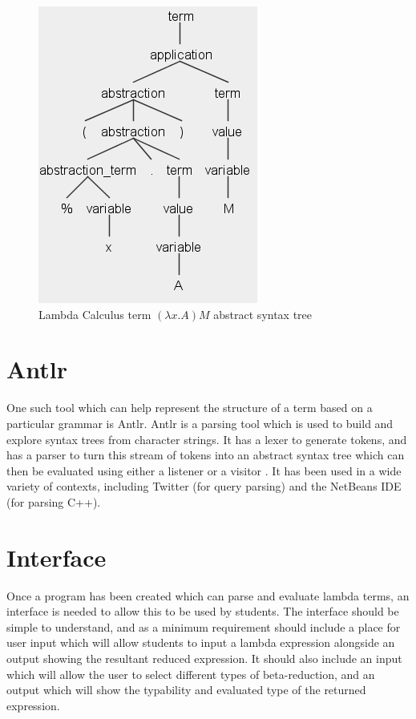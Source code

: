 \documentclass[a4paper,11pt]{report}
\begin{document}
\begin{figure}[p]
	\centering
	\includegraphics[scale=0.75]{images/abstract_syntax_tree}
	\caption{Lambda Calculus term $(\lambda x.A)M$ abstract syntax tree}
	\label{abstract_syntax_tree}
\end{figure}


\section{Antlr}

One such tool which can help represent the structure of a term based on a particular grammar is Antlr. Antlr is a parsing tool which is used to build and explore syntax trees from character strings. It has a lexer to generate tokens, and has a parser to turn this stream of tokens into an abstract syntax tree which can then be evaluated using either a listener or a visitor \cite{Parr2012}. It has been used in a wide variety of contexts, including Twitter (for query parsing) and the NetBeans IDE (for parsing C++). %

\section{Interface}

Once a program has been created which can parse and evaluate lambda terms, an interface is needed to allow this to be used by students. The interface should be simple to understand, and as a minimum requirement should include a place for user input which will allow students to input a lambda expression alongside an output showing the resultant reduced expression. It should also include an input which will allow the user to select different types of beta-reduction, and an output which will show the typability and evaluated type of the returned expression.\\
\end{document}
